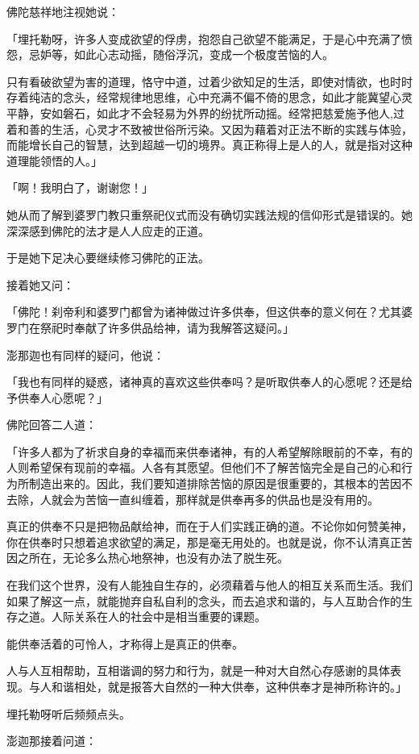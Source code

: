 \documentclass[twoside,openany]{book}
\begin{document}
佛陀慈祥地注视她说：

「埋托勒呀，许多人变成欲望的俘虏，抱怨自己欲望不能满足，于是心中充满了愤怨，忌妒等，如此心志动摇，随俗浮沉，变成一个极度苦恼的人。

只有看破欲望为害的道理，恪守中道，过着少欲知足的生活，即使对情欲，也时时存着纯洁的念头，经常规律地思维，心中充满不偏不倚的思念，如此才能冀望心灵平静，安如磐石，如此才不会轻易为外界的纷扰所动摇。经常把慈爱施予他人,过着和善的生活，心灵才不致被世俗所污染。又因为藉着对正法不断的实践与体验，而能增长自己的智慧，达到超越一切的境界。真正称得上是人的人，就是指对这种道理能领悟的人。」

「啊！我明白了，谢谢您！」

她从而了解到婆罗门教只重祭祀仪式而没有确切实践法规的信仰形式是错误的。她深深感到佛陀的法才是人人应走的正道。

于是她下足决心要继续修习佛陀的正法。

接着她又问：

「佛陀！刹帝利和婆罗门都曾为诸神做过许多供奉，但这供奉的意义何在？尤其婆罗门在祭祀时奉献了许多供品给神，请为我解答这疑问。」

澎那迦也有同样的疑问，他说：

「我也有同样的疑惑，诸神真的喜欢这些供奉吗？是听取供奉人的心愿呢？还是给予供奉人心愿呢？」

佛陀回答二人道：

「许多人都为了祈求自身的幸福而来供奉诸神，有的人希望解除眼前的不幸，有的人则希望保有现前的幸福。人各有其愿望。但他们不了解苦恼完全是自己的心和行为所制造出来的。因此，我们要知道排除苦恼的原因是很重要的，其根本的苦因不去除，人就会为苦恼一直纠缠着，那样就是供奉再多的供品也是没有用的。

真正的供奉不只是把物品献给神，而在于人们实践正确的道。不论你如何赞美神，你在供奉时只想着追求欲望的满足，那是毫无用处的。也就是说，你不认清真正苦因之所在，无论多么热心地祭神，也没有办法了脱生死。

在我们这个世界，没有人能独自生存的，必须藉着与他人的相互关系而生活。我们如果了解这一点，就能抛弃自私自利的念头，而去追求和谐的，与人互助合作的生存之道。人际关系在人的社会中是相当重要的课题。

能供奉活着的可怜人，才称得上是真正的供奉。

人与人互相帮助，互相谐调的努力和行为，就是一种对大自然心存感谢的具体表现。与人和谐相处，就是报答大自然的一种大供奉，这种供奉才是神所称许的。」

埋托勒呀听后频频点头。

澎迦那接着问道：
\end{document}
